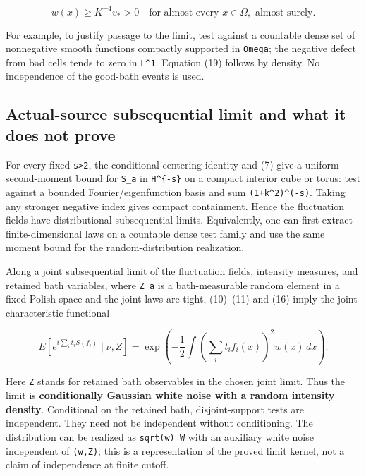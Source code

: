 \documentclass[
  11pt,
]{article}
\begin{document}
\[
 \boxed{w(x)\ge K^{-4}v_*>0\quad\text{for almost every }x\in\Omega,\text{ almost surely}.}
 \tag{19}
\]

For example, to justify passage to the limit, test against a countable
dense set of nonnegative smooth functions compactly supported in
\texttt{Omega}; the negative defect from bad cells tends to zero in
\texttt{L\^{}1}. Equation (19) follows by density. No independence of
the good-bath events is used.

\hypertarget{actual-source-subsequential-limit-and-what-it-does-not-prove}{%
\subsection{Actual-source subsequential limit and what it does not
prove}\label{actual-source-subsequential-limit-and-what-it-does-not-prove}}

For every fixed \texttt{s\textgreater{}2}, the conditional-centering
identity and (7) give a uniform second-moment bound for \texttt{S\_a} in
\texttt{H\^{}\{-s\}} on a compact interior cube or torus: test against a
bounded Fourier/eigenfunction basis and sum
\texttt{(1+\textbar{}k\textbar{}\^{}2)\^{}(-s)}. Taking any stronger
negative index gives compact containment. Hence the fluctuation fields
have distributional subsequential limits. Equivalently, one can first
extract finite-dimensional laws on a countable dense test family and use
the same moment bound for the random-distribution realization.

Along a joint subsequential limit of the fluctuation fields, intensity
measures, and retained bath variables, where \texttt{Z\_a} is a
bath-measurable random element in a fixed Polish space and the joint
laws are tight, (10)--(11) and (16) imply the joint characteristic
functional

\[
 E\left[e^{i\sum_it_iS(f_i)}\mid\nu,Z\right]
 =\exp\left(-\frac12\int\left(\sum_it_if_i(x)\right)^2w(x)\,dx\right).
 \tag{20}
\]

Here \texttt{Z} stands for retained bath observables in the chosen joint
limit. Thus the limit is \textbf{conditionally Gaussian white noise with
a random intensity density}. Conditional on the retained bath,
disjoint-support tests are independent. They need not be independent
without conditioning. The distribution can be realized as
\texttt{sqrt(w)\ W} with an auxiliary white noise independent of
\texttt{(w,Z)}; this is a representation of the proved limit kernel, not
a claim of independence at finite cutoff.
\end{document}
